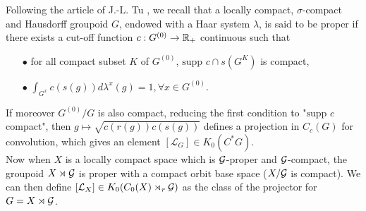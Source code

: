 Following the article of J.-L. Tu \cite{TuBC}, we recall that a locally compact, $\sigma$-compact and Hausdorff groupoid $G$, endowed with a Haar system $\lambda$, is said to be proper if there exists a cut-off function $c:G^{(0)}\rightarrow \mathbb R_+$ continuous such that 
\begin{itemize}
\item[$\bullet$] for all compact subset $K$ of $G^{(0)}$, $\text{supp }c\cap s(G^K)$ is compact,
\item[$\bullet$] $\int_{G^x}c(s(g))d\lambda^x(g)=1,\forall x \in G^{(0)}$.
\end{itemize}
If moreover $G^{(0)}/G$ is also compact, reducing the first condition to "$\text{supp }c$ compact", then $g\mapsto \sqrt{c(r(g))c(s(g))}$ defines a projection in $C_c(G)$ for convolution, which gives an element $[\mathcal L_G] \in K_0(C^*G)$.\\

Now when $X$ is a locally compact space which is $\mathcal G$-proper and $\mathcal G$-compact, the groupoid $X\rtimes\mathcal G$ is proper with a compact orbit base space ($X/\mathcal G$ is compact). We can then define $[\mathcal L_X]\in K_0(C_0(X)\rtimes_r \mathcal G)$ as the class of the projector for $G=X\rtimes\mathcal G$.

